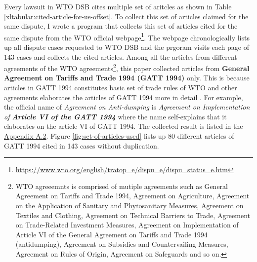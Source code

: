 Every lawsuit in WTO DSB 
cites multiple set of aritcles
as shown in Table 
\ref{xltabular:cited-article-for-us-offset}. 
To collect this set of articles claimed for the same dispute, I wrote a program that collects this set of articles cited for the same dispute from the WTO official webpage\footnote{\url{https://www.wto.org/english/tratop_e/dispu_e/dispu_status_e.htm}}. 
The webpage chronologically lists up all dispute cases
requested to WTO DSB and the prgoram visits each page of 143 cases
and collects the cited articles. Among all the articles from different agreements
of the WTO agreements\footnote{
    WTO agreeemnts is comprised of mutiple agreements such as
    General Agreement on Tariffs and Trade 1994,
    Agreement on Agriculture,
    Agreement on the Application of Sanitary and Phytosanitary Measures,
    Agreement on Textiles and Clothing,
    Agreement on Technical Barriers to Trade,
    Agreement on Trade-Related Investment Measures,
    Agreement on Implementation of Article VI of the General Agreement on Tariffs and Trade 1994 (antidumping),
    Agreement on Subsidies and Countervailing Measures,
    Agreement on Rules of Origin,
    Agreement on Safeguards and so on.
    },
this paper collected articles from \textbf{General Agreement on Tariffs and Trade 1994 (GATT 1994)} only. 
This is because articles in GATT 1994 constitutes basic set of trade rules of WTO and other agreements 
elaborates the articles of GATT 1994 more in detail \citep{world1999wto}. For example, the official name of \textit{Agreement on Anti-dumping}
is \textit{Agreement on Implementation of \textbf{Article VI of the GATT 1994}}
where the name self-explains that it elaborates on the article VI of GATT 1994.
The collected result is listed in the \hyperref[sub:cited-articles-table]{Appendix A.2}. Figure \ref{fig:set-of-articles-used} 
lists up 80 different articles of GATT 1994 cited in 143 cases without duplication.


